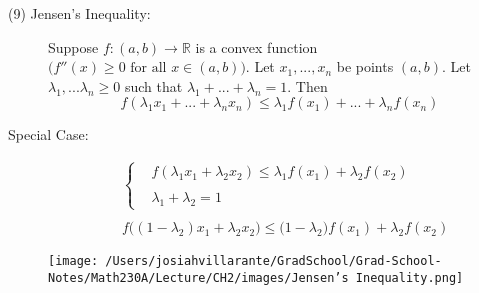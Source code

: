 \begin{description}
    \item[(9) Jensen's Inequality:] Suppose $f:(a,b) \rightarrow \mathbb{R}$ is a convex function $\big(f''(x) \geq 0 \text{ for all } x \in (a,b)\big)$. Let $x_1,...,x_n$ be points $(a,b)$. Let $\lambda _1,... \lambda_n \geq 0$ such that $\lambda_1 +...+ \lambda_n = 1.$
    Then
    $$f(\lambda_1x_1 + ... + \lambda_nx_n) \leq \lambda_1f(x_1) +...+\lambda_nf(x_n)$$
    \item[Special Case: ]
    \begin{align*} &\begin{cases}&f(\lambda_1x_1 + \lambda_2x_2) \leq \lambda_1f(x_1) +\lambda_2f(x_2) \\ \\ &\lambda_1 + \lambda_2 = 1 \end{cases} \\ \\ &f\big((1-\lambda_2)x_1 + \lambda_2x_2\big) \leq \big(1-\lambda_2\big)f(x_1) +\lambda_2f(x_2) \end{align*}
\end{description}

\begin{figure}[h]
    \texttt{[image: /Users/josiahvillarante/GradSchool/Grad-School-Notes/Math230A/Lecture/CH2/images/Jensen's Inequality.png]}
\end{figure}